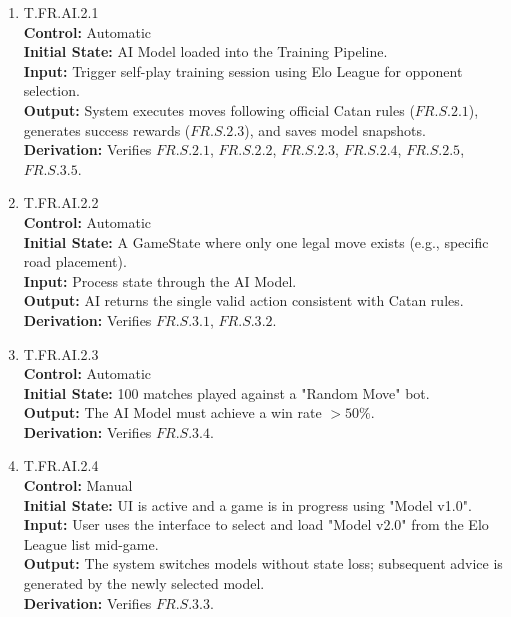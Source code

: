 \documentclass[12pt, titlepage]{article}
\begin{document}
\begin{enumerate}
    \item{\hypertarget{T.FR.AI.2.1}{T.FR.AI.2.1}\\}
    \textbf{Control:} Automatic \\
    \textbf{Initial State:} AI Model loaded into the Training Pipeline. \\
    \textbf{Input:} Trigger self-play training session using Elo League for opponent selection. \\
    \textbf{Output:} System executes moves following official Catan rules ($\hyperref[FR.S.2.1]{FR.S.2.1}$), generates success rewards ($\hyperref[FR.S.2.3]{FR.S.2.3}$), and saves model snapshots.\\
    \textbf{Derivation:} Verifies $\hyperref[FR.S.2.1]{FR.S.2.1}$, $\hyperref[FR.S.2.2]{FR.S.2.2}$, $\hyperref[FR.S.2.3]{FR.S.2.3}$, $\hyperref[FR.S.2.4]{FR.S.2.4}$, $\hyperref[FR.S.2.5]{FR.S.2.5}$, $\hyperref[FR.S.3.5]{FR.S.3.5}$.

    \item{\hypertarget{T.FR.AI.2.2}{T.FR.AI.2.2}\\}
    \textbf{Control:} Automatic \\
    \textbf{Initial State:} A GameState where only one legal move exists (e.g., specific road placement).\\
    \textbf{Input:} Process state through the AI Model. \\
    \textbf{Output:} AI returns the single valid action consistent with Catan rules. \\
    \textbf{Derivation:} Verifies $\hyperref[FR.S.3.1]{FR.S.3.1}$, $\hyperref[FR.S.3.2]{FR.S.3.2}$.

    \item{\hypertarget{T.FR.AI.2.3}{T.FR.AI.2.3}\\}
    \textbf{Control:} Automatic \\
    \textbf{Initial State:} 100 matches played against a "Random Move" bot. \\
    \textbf{Output:} The AI Model must achieve a win rate $>50\%$. \\
    \textbf{Derivation:} Verifies $\hyperref[FR.S.3.4]{FR.S.3.4}$.

    \item{\hypertarget{T.FR.AI.2.4}{T.FR.AI.2.4}\\}
    \textbf{Control:} Manual \\
    \textbf{Initial State:} UI is active and a game is in progress using "Model v1.0". \\
    \textbf{Input:} User uses the interface to select and load "Model v2.0" from the Elo League list mid-game. \\
    \textbf{Output:} The system switches models without state loss; subsequent advice is generated by the newly selected model. \\
    \textbf{Derivation:} Verifies $\hyperref[FR.S.3.3]{FR.S.3.3}$.
\end{enumerate}
\end{document}
